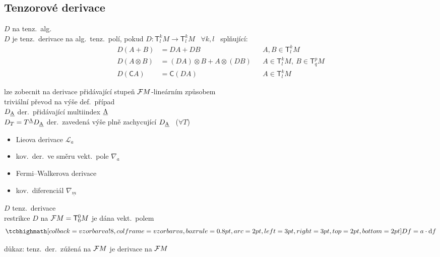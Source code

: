 \subsection{Tenzorové derivace}

\begin{definice}
 $D$ na tenz.\ alg. \\
$D$ je tenz.\ derivace na alg.\ tenz.\ polí, pokud \quad $D: \mathsf{T}^k_lM\to\mathsf{T}^k_lM$ \ $\forall k,l$ \ splňující:
\[
  \begin{aligned}
    D(A+B) &= DA + DB && A, B\in\mathsf{T}^k_lM \\
    D(A\otimes B) &= (DA)\otimes B + A\otimes(DB) && A\in\mathsf{T}^k_lM,\ B\in\mathsf{T}^p_qM \\
    D(\mathsf{C}A) &= \mathsf{C}(DA) && A\in\mathsf{T}^k_lM
  \end{aligned}
\]
\end{definice}
lze zobecnit na derivace přidávající stupeň $\mathcal{F} M$-lineárním způsobem \\
\quad triviální převod na výše def.\ případ \\
\qquad $D_{\underline{\mathrm{A}}}$ \quad der.\ přidávající multiindex $\underline{\mathrm{A}}$ \\
\qquad $D_T = T^{\underline{\mathrm{A}}}D_{\underline{\mathrm{A}}}$ \quad der.\ zavedená výše plně zachycující $D_{\underline{\mathrm{A}}}$ \ ($\forall T$)

\begin{priklad}[Př.]
\begin{itemize}[nosep]
  \item Lieova derivace \quad $\mathcal{L}_a$
  \item kov.\ der.\ ve směru vekt.\ pole \quad $\nabla_a$
  \item[$\lceil$] Fermi--Walkerova derivace
  \item[$\lfloor$] kov.\ diferenciál \quad $\nabla_{\underline{m}}$
\end{itemize}
\end{priklad}

\begin{veta}[T:]
$D$ tenz.\ derivace \\
restrikce $D$ na $\mathcal{F} M = \mathsf{T}^0_0M$ je dána vekt.\ polem
\[
  \vzorec{Df = a\cdot\dd f}
\]
\end{veta}
\quad důkaz: tenz.\ der.\ zúžená na $\mathcal{F} M$ je derivace na $\mathcal{F} M$

